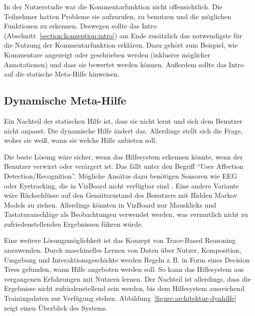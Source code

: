 \documentclass[
	headsepline,
	footsepline,
	fontsize=12pt,
	bibliography=totoc
]{scrbook}
\begin{document}
In der Nutzerstudie war die Kommentarfunktion nicht offensichtlich. Die Teilnehmer hatten Probleme sie aufzurufen, zu benutzen und die möglichen Funktionen zu erkennen. Deswegen sollte das Intro (Abschnitt~\ref{section:konzeption:intro}) am Ende zusätzlich das notwendigste für die Nutzung der Kommentarfunktion erklären. Dazu gehört zum Beispiel, wie Kommentare angezeigt oder geschrieben werden (inklusive möglicher Annotationen) und dass sie bewertet werden können. Außerdem sollte das Intro auf die statische Meta-Hilfe hinweisen.

\subsection{Dynamische Meta-Hilfe}

Ein Nachteil der statischen Hilfe ist, dass sie nicht lernt und sich dem Benutzer nicht anpasst. Die dynamische Hilfe ändert das. Allerdings stellt sich die Frage, woher sie weiß, wann sie welche Hilfe anbieten soll.


Die beste Lösung wäre sicher, wenn das Hilfesystem erkennen könnte, wenn der Benutzer verwirrt oder verärgert ist. Das fällt unter den Begriff \enquote{User Affection Detection/Recognition}. Mögliche Ansätze dazu benötigen Sensoren wie EEG oder Eyetracking, die in VizBoard nicht verfügbar sind \cite{Li2005, Liao2006}. Eine andere Variante wäre Rückschlüsse auf den Gemütszustand des Benutzers mit Hidden Markov Models \cite{Rabiner1986} zu ziehen. Allerdings könnten in VizBoard nur Mausklicks und Tastaturanschläge als Beobachtungen verwendet werden, was vermutlich nicht zu zufriedenstellenden Ergebnissen führen würde.


Eine weitere Lösungsmöglichkeit ist das Konzept von Trace-Based Reasoning \cite{Cordier2013} anzuwenden. Durch maschinelles Lernen \cite{Kotsiantis2007} von Daten über Nutzer, Komposition, Umgebung und Interaktionsgeschichte werden Regeln z.\,B. in Form eines Decision Trees gefunden, wann Hilfe angeboten werden soll. So kann das Hilfesystem aus vergangenen Erfahrungen mit Nutzern lernen. Der Nachteil ist allerdings, dass die Ergebnisse nicht zufriedenstellend sein werden, bis dem Hilfesystem ausreichend Trainingsdaten zur Verfügung stehen. Abbildung~\ref{figure:architektur-dynhilfe} zeigt einen Überblick des Systems.
\end{document}
